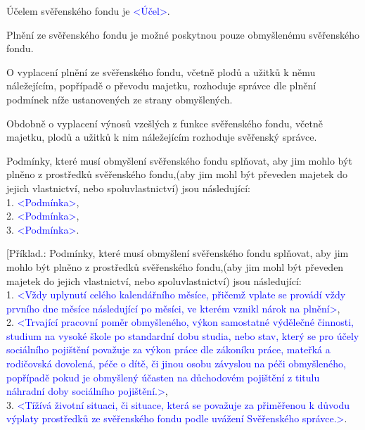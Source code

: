 \documentclass[parskip=half]{scrreprt}
\begin{document}
\begin{contract}

Účelem svěřenského fondu je \textcolor{blue}{<Účel>}.

\parnumbertrue


Plnění ze svěřenského fondu je možné poskytnou pouze obmyšlenému svěřenského fondu.

O vyplacení plnění ze svěřenského fondu, včetně plodů a užitků k němu náležejícím, popřípadě o převodu majetku, rozhoduje správce dle plnění podmínek níže ustanovených ze strany obmyšlených.

Obdobně o vyplacení výnosů vzešlých z funkce svěřenského fondu, včetně majetku, plodů a užitků k nim náležejícím rozhoduje svěřenský správce.

Podmínky, které musí obmyšlení svěřenského fondu splňovat, aby jim mohlo být plněno z prostředků svěřenského fondu,(aby jim mohl být převeden majetek do jejich vlastnictví, nebo spoluvlastnictví) jsou následující:\\
1. \textcolor{blue}{<Podmínka>},\\
2. \textcolor{blue}{<Podmínka>},\\
3. \textcolor{blue}{<Podmínka>}.

\parnumberfalse
[Příklad.: 
Podmínky, které musí obmyšlení svěřenského fondu splňovat, aby jim mohlo být plněno z prostředků svěřenského fondu,(aby jim mohl být převeden majetek do jejich vlastnictví, nebo spoluvlastnictví) jsou následující:\\
1. \textcolor{blue}{<Vždy uplynutí celého kalendářního měsíce, přičemž vplate se provádí vždy prvního dne měsíce následující po měsíci, ve kterém vznikl nárok na plnění>},\\
2. \textcolor{blue}{<Trvající pracovní poměr obmyšleného, výkon samostatné výdělečné činnosti, studium na vysoké škole po standardní dobu studia, nebo stav, který se pro účely sociálního pojištění považuje za výkon práce dle zákoníku práce, mateřká a rodičovská dovolená, péče o dítě, či jinou osobu závyslou na péči obmyšleného, popřípadě pokud je obmyšlený účasten na důchodovém pojištění z titulu náhradní doby sociálního pojištění.>},\\
3. \textcolor{blue}{<Tížívá životní situaci, či situace, která se považuje za přiměřenou k důvodu výplaty prostředků ze svěřenského fondu podle uvážení Svěřenského správce.>}.\\


\end{contract}
\end{document}
